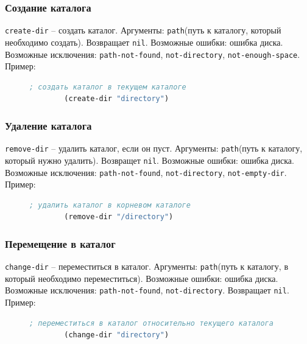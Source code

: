 \subsubsection{Создание каталога}

\texttt{create-dir} -- создать каталог. Аргументы: \texttt{path}(путь к каталогу, который необходимо создать). Возвращает \texttt{nil}. Возможные ошибки: ошибка диска. Возможные исключения: \texttt{path-not-found}, \texttt{not-directory}, \texttt{not-enough-space}. Пример:
\begin{figure}[H]
	\begin{lstlisting}[language=Lisp]
		; создать каталог в текущем каталоге
		(create-dir "directory")
	\end{lstlisting}
\end{figure}

\subsubsection{Удаление каталога}

\texttt{remove-dir} -- удалить каталог, если он пуст. Аргументы: \texttt{path}(путь к каталогу, который нужно удалить). Возвращет \texttt{nil}. Возможные ошибки: ошибка диска. Возможные исключения: \texttt{path-not-found}, \texttt{not-directory}, \texttt{not-empty-dir}. Пример:
\begin{figure}[H]
	\begin{lstlisting}[language=Lisp]
		; удалить каталог в корневом каталоге
		(remove-dir "/directory")
	\end{lstlisting}
\end{figure}

\subsubsection{Перемещение в каталог}

\texttt{change-dir} -- переместиться в каталог. Аргументы: \texttt{path}(путь к каталогу, в который необходимо переместиться). Возможные ошибки: ошибка диска. Возможные исключения: \texttt{path-not-found}, \texttt{not-directory}. Возвращает \texttt{nil}. Пример:
\begin{figure}[H]
	\begin{lstlisting}[language=Lisp]
		; переместиться в каталог относительно текущего каталога
		(change-dir "directory") 
	\end{lstlisting}
\end{figure}

